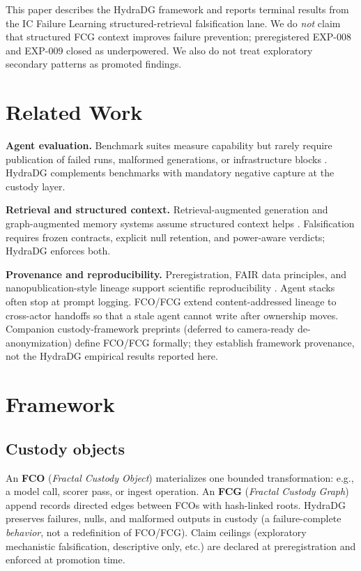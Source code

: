 \documentclass{article}
\begin{document}
This paper describes the HydraDG framework and reports terminal results from the IC Failure Learning structured-retrieval falsification lane.
We do \emph{not} claim that structured FCG context improves failure prevention; preregistered EXP-008 and EXP-009 closed as underpowered.
We also do not treat exploratory secondary patterns as promoted findings.

\section{Related Work}

\textbf{Agent evaluation.} Benchmark suites measure capability but rarely require publication of failed runs, malformed generations, or infrastructure blocks \cite{liu2023agentbench,zhou2023webarena}.
HydraDG complements benchmarks with mandatory negative capture at the custody layer.

\textbf{Retrieval and structured context.} Retrieval-augmented generation and graph-augmented memory systems assume structured context helps \cite{lewis2020rag,edge2024graphrag}.
Falsification requires frozen contracts, explicit null retention, and power-aware verdicts; HydraDG enforces both.

\textbf{Provenance and reproducibility.} Preregistration, FAIR data principles, and nanopublication-style lineage support scientific reproducibility \cite{nosek2018prereg,wilkinson2016fair,groth2010nano}.
Agent stacks often stop at prompt logging.
FCO/FCG extend content-addressed lineage to cross-actor handoffs so that a stale agent cannot write after ownership moves.
Companion custody-framework preprints (deferred to camera-ready de-anonymization) define FCO/FCG formally; they establish framework provenance, not the HydraDG empirical results reported here.

\section{Framework}

\subsection{Custody objects}

An \textbf{FCO} (\emph{Fractal Custody Object}) materializes one bounded transformation: e.g., a model call, scorer pass, or ingest operation.
An \textbf{FCG} (\emph{Fractal Custody Graph}) append records directed edges between FCOs with hash-linked roots.
HydraDG preserves failures, nulls, and malformed outputs in custody (a failure-complete \emph{behavior}, not a redefinition of FCO/FCG).
Claim ceilings (exploratory mechanistic falsification, descriptive only, etc.) are declared at preregistration and enforced at promotion time.
\end{document}
